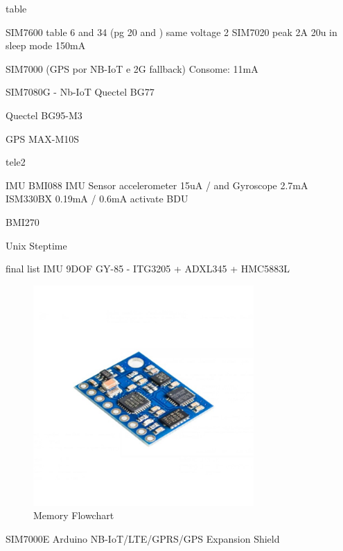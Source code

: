table

SIM7600 
table 6 and 34 (pg 20 and ) same voltage
2
SIM7020
peak 2A 20u in sleep mode 150mA

SIM7000 (GPS por NB-IoT e 2G fallback)
Consome: 11mA

SIM7080G - Nb-IoT
Quectel BG77

Quectel BG95-M3

 
GPS
MAX-M10S

tele2

IMU
BMI088 IMU Sensor
accelerometer 15uA  / and Gyroscope 2.7mA
ISM330BX
0.19mA / 0.6mA
activate BDU

BMI270


Unix Steptime

final list
IMU 9DOF GY-85 - ITG3205 + ADXL345 + HMC5883L
\begin{figure}[H]
    \centering
    \includegraphics[width=0.75\textwidth]{images/chapter/design/components/final_IMU.png}  %
    \caption{Memory Flowchart}
    \label{fig:Memory Flowchart}        
\end{figure}

SIM7000E Arduino NB-IoT/LTE/GPRS/GPS Expansion Shield

